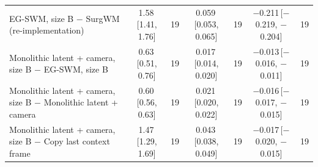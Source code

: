 \begin{tabular}{lcccccc}
EG-SWM, size B $-$ SurgWM (re-implementation) & 1.58\,{\scriptsize[1.41, 1.76]} & 19 & 0.059\,{\scriptsize[0.053, 0.065]} & 19 & $-$0.211\,{\scriptsize[$-$0.219, $-$0.204]} & 19 \\
Monolithic latent + camera, size B $-$ EG-SWM, size B & 0.63\,{\scriptsize[0.51, 0.76]} & 19 & 0.017\,{\scriptsize[0.014, 0.020]} & 19 & $-$0.013\,{\scriptsize[$-$0.016, $-$0.011]} & 19 \\
Monolithic latent + camera, size B $-$ Monolithic latent + camera & 0.60\,{\scriptsize[0.56, 0.63]} & 19 & 0.021\,{\scriptsize[0.020, 0.022]} & 19 & $-$0.016\,{\scriptsize[$-$0.017, $-$0.015]} & 19 \\
Monolithic latent + camera, size B $-$ Copy last context frame & 1.47\,{\scriptsize[1.29, 1.69]} & 19 & 0.043\,{\scriptsize[0.038, 0.049]} & 19 & $-$0.017\,{\scriptsize[$-$0.020, $-$0.015]} & 19 \\
\bottomrule
\end{tabular}
